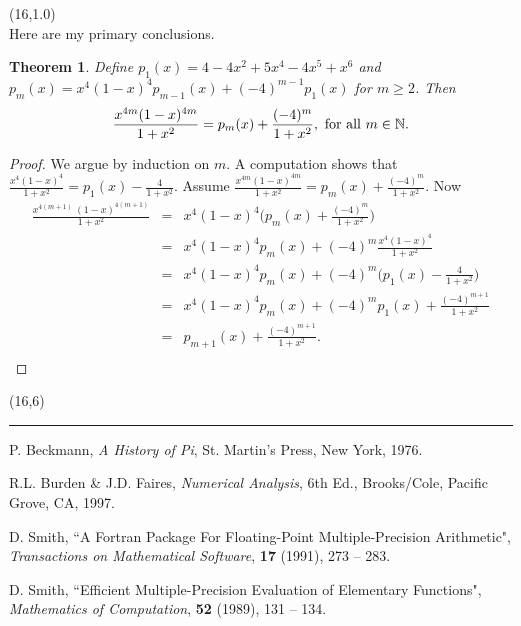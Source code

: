 \documentclass[a0]{a0poster}
\newtheorem{theorem}{Theorem}
\theoremstyle{definition}
\def\LHead#1{\noindent{\bf \LARGE\color{DarkBlue} #1}\smallskip}
\begin{document}
\begin{textblock}{7}(16,1.0)
\LHead{Conclusion}\\
Here are my primary conclusions.

\begin{theorem}\label{basictheorem}
Define $p_1(x) = 4-4x^2+5x^4-4x^5+x^6$ and $p_m(x)
= x^4 (1-x)^4 p_{m-1}(x) + (-4)^{m-1} p_1(x)$ for $m\geq 2$. Then
$$\frac{x^{4m} (1-x)^{4m}}{1+x^2} = p_m(x) + \frac{(-4)^m}{1+x^2},
\ {\rm for\ all\ }m\in\mathbb{N}.$$
\end{theorem}

\begin{proof}
We argue by induction on $m$. A computation shows that $\frac{x^4 (1-x)^4}{1+x^2} =
p_1(x) - \frac{4}{1+x^2}$. Assume $\frac{x^{4m} (1-x)^{4m}}{1+x^2} = p_m(x) +
\frac{(-4)^m}{1+x^2}$. Now
\begin{eqnarray*}
\frac{x^{4(m+1)}\ (1-x)^{4(m+1)}}{1+x^2} &=&
x^4 (1-x)^4 \Big( p_m(x) + \frac{(-4)^m}{1+x^2} \Big)\\
&=& x^4 (1-x)^4  p_m(x) + (-4)^m \frac{x^4 (1-x)^4}{1+x^2}\\
&=& x^4 (1-x)^4  p_m(x) + (-4)^m \Big(p_1(x) - \frac{4}{1+x^2}\Big)\\
&=& x^4 (1-x)^4  p_m(x) + (-4)^m p_1(x) + \frac{(-4)^{m+1}}{1+x^2}\\
&=& p_{m+1}(x) + \frac{(-4)^{m+1}}{1+x^2}.\\
\end{eqnarray*}
\vskip-70pt
\end{proof}

\end{textblock}
\begin{textblock}{7}(16,6)
\renewcommand\refname{{\LARGE\color{DarkBlue} References}}
\hrule
\begin{thebibliography}{aaaa}
P. Beckmann, \textit{A History of Pi},
St. Martin's Press, New York, 1976.

R.L. Burden \& J.D. Faires, \textit{Numerical Analysis}, 6th Ed., Brooks/Cole,
Pacific Grove, CA, 1997.

D. Smith, ``A Fortran Package For Floating-Point Multiple-Precision Arithmetic",
\textit{Transactions on Mathematical Software}, \textbf{17} (1991),
273 -- 283.

D. Smith, ``Efficient Multiple-Precision Evaluation of
Elementary Functions", \textit{Mathematics of Computation},
\textbf{52} (1989), 131 -- 134.

\end{thebibliography}
\end{textblock}
\end{document}
